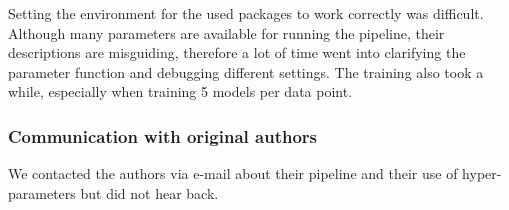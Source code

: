 
Setting the environment for the used packages to work correctly was difficult. Although many parameters are available for running the pipeline, their descriptions are misguiding, therefore a lot of time went into clarifying the parameter function and debugging different settings. The training also took a while, especially when training 5 models per data point. 

\subsubsection*{Communication with original authors}


We contacted the authors via e-mail about their pipeline and their use of hyper-parameters but did not hear back.

